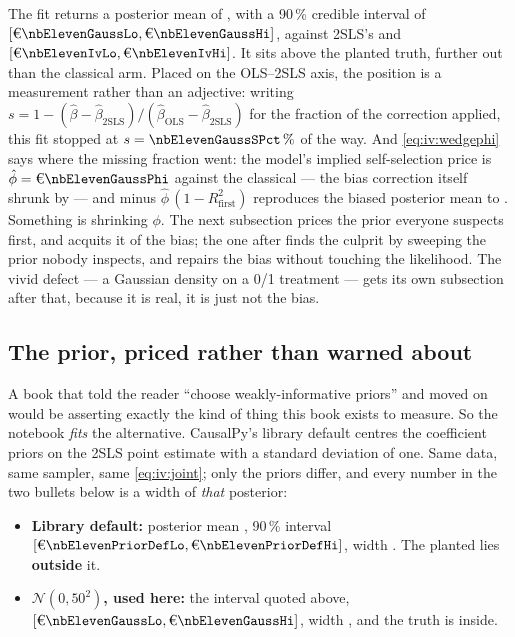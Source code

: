 The fit returns a posterior mean of \eur{\nbElevenGaussMean}, with a 90\,\% credible interval of
$[\eur{\nbElevenGaussLo}, \eur{\nbElevenGaussHi}]$, against 2SLS's \eur{\nbElevenIvEst} and
$[\eur{\nbElevenIvLo}, \eur{\nbElevenIvHi}]$. It sits \eur{\nbElevenGaussErr} above the planted
truth, further out than the classical arm. Placed on the OLS--2SLS axis, the position is a
measurement rather than an adjective: writing
$s = 1 - (\hat\beta - \hat\beta_{\text{2SLS}})/(\hat\beta_{\text{OLS}} -
\hat\beta_{\text{2SLS}})$ for the fraction of the correction applied, this fit stopped at
$s = \pc{\nbElevenGaussSPct}$ of the way. And \cref{eq:iv:wedgephi} says where the missing
fraction went: the model's implied self-selection price is $\hat\phi = \eur{\nbElevenGaussPhi}$
against the classical \eur{\nbElevenPhiCf} --- the bias correction itself shrunk by
\pc{\nbElevenGaussPhiShrinkPct} --- and \eur{\nbElevenNaive} minus
$\hat\phi\,(1 - R^{2}_{\text{first}})$ reproduces the biased posterior mean to
\eur{\nbElevenGaussIdentityGap}. Something is shrinking $\phi$. The next subsection prices the
prior everyone suspects first, and acquits it of the bias; the one after finds the culprit by
sweeping the prior nobody inspects, and repairs the bias without touching the likelihood. The
vivid defect --- a Gaussian density on a 0/1 treatment --- gets its own subsection after that,
because it is real, it is just not the bias.

\subsection*{The prior, priced rather than warned about}

A book that told the reader ``choose weakly-informative priors'' and moved on would be asserting
exactly the kind of thing this book exists to measure. So the notebook \emph{fits} the alternative.
CausalPy's library default centres the coefficient priors on the 2SLS point estimate with a
standard deviation of one. Same data, same sampler, same \cref{eq:iv:joint}; only the priors differ,
and every number in the two bullets below is a width of \emph{that} posterior:

\begin{itemize}[leftmargin=*, itemsep=.25em]
  \item \textbf{Library default:} posterior mean \eur{\nbElevenPriorDefMean}, 90\,\% interval
        $[\eur{\nbElevenPriorDefLo}, \eur{\nbElevenPriorDefHi}]$, width
        \eur{\nbElevenPriorDefWidth}. The planted \eur{\nbElevenTrue} lies \textbf{outside} it.
  \item \textbf{$\mathcal N(0, 50^2)$, used here:} the interval quoted above,
        $[\eur{\nbElevenGaussLo}, \eur{\nbElevenGaussHi}]$, width
        \eur{\nbElevenPriorWeakWidth}, and the truth is inside.
\end{itemize}

